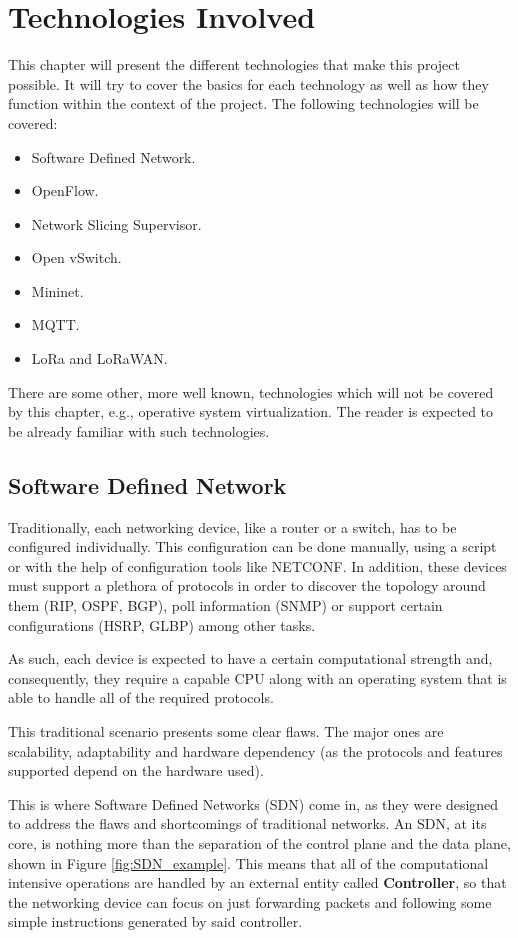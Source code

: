 \chapter{Technologies Involved} \label{chapter:techonlogies}
This chapter will present the different technologies that make this project possible. It will try to cover the basics for each technology as well as how they function within the context of the project. The following technologies will be covered:
\begin{itemize}
    \item Software Defined Network.
    \item OpenFlow.
    \item Network Slicing Supervisor.
    \item Open vSwitch.
    \item Mininet.
    \item MQTT.
    \item LoRa and LoRaWAN.
\end{itemize}

There are some other, more well known, technologies which will not be covered by this chapter, e.g., operative system virtualization. The reader is expected to be already familiar with such technologies.

\section{Software Defined Network}
Traditionally, each networking device, like a router or a switch, has to be configured individually. This configuration can be done manually, using a script or with the help of configuration tools like NETCONF. In addition, these devices must support a plethora of protocols in order to discover the topology around them (RIP, OSPF, BGP), poll information (SNMP) or support certain configurations (HSRP, GLBP) among other tasks.

As such, each device is expected to have a certain computational strength and, consequently, they require a capable CPU along with an operating system that is able to handle all of the required protocols.

This traditional scenario presents some clear flaws. The major ones are scalability, adaptability and hardware dependency (as the protocols and features supported depend on the hardware used).

This is where Software Defined Networks (SDN) come in, as they were designed to address the flaws and shortcomings of traditional networks. An SDN, at its core, is nothing more than the separation of the control plane and the data plane, shown in Figure \ref{fig:SDN_example}. This means that all of the computational intensive operations are handled by an external entity called \textbf{Controller}, so that the networking device can focus on just forwarding packets and following some simple instructions generated by said controller.

